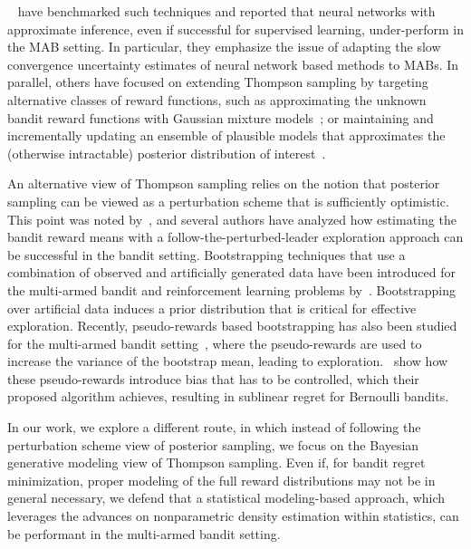 ~\citet{ip-Riquelme2018} have benchmarked such techniques and reported that neural networks with approximate inference, even if successful for supervised learning, under-perform in the MAB setting. In particular, they emphasize the issue of adapting the slow convergence uncertainty estimates of neural network based methods to MABs.
In parallel, others have focused on extending Thompson sampling by targeting alternative classes of reward functions, such as approximating the unknown bandit reward functions with Gaussian mixture models~\citep{ip-Urteaga2018}; or maintaining and incrementally updating an ensemble of plausible models that approximates the (otherwise intractable) posterior distribution of interest~\citep{ip-Lu2017}.

An alternative view of Thompson sampling relies on the notion that posterior sampling can be viewed as a perturbation scheme that is sufficiently optimistic.
This point was noted by~\citet{ip-Agrawal2013, ip-Agrawal2013a}, and several authors have analyzed how estimating the bandit reward means with a follow-the-perturbed-leader exploration approach can be successful in the bandit setting.
Bootstrapping techniques that use a combination of observed and artificially generated data have been introduced for the multi-armed bandit and reinforcement learning problems by~\citet{j-Osband2015,j-Eckles2019}.
Bootstrapping over artificial data induces a prior distribution that is critical for effective exploration.
Recently, pseudo-rewards based bootstrapping has also been studied for the multi-armed bandit setting~\citep{ip-Kveton2019,ip-Kveton2019a}, where the pseudo-rewards are used to increase the variance of the bootstrap mean, leading to exploration.~\citet{ip-Kveton2019} show how these pseudo-rewards introduce bias that has to be controlled, which their proposed algorithm achieves, resulting in sublinear regret for Bernoulli bandits.

In our work, we explore a different route, in which instead of following the perturbation scheme view of posterior sampling, we focus on the Bayesian generative modeling view of Thompson sampling. Even if, for bandit regret minimization, proper modeling of the full reward distributions may not be in general necessary, we defend that a statistical modeling-based approach, which leverages the advances on nonparametric density estimation within statistics, can be performant in the multi-armed bandit setting.

